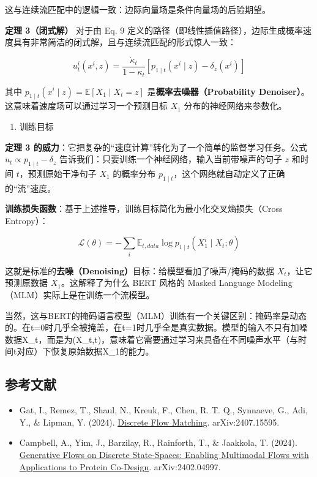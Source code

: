这与连续流匹配中的逻辑一致：边际向量场是条件向量场的后验期望。

\textbf{定理 3（闭式解）} 对于由 Eq. 9 定义的路径（即线性插值路径），边际生成概率速度具有非常简洁的闭式解，且与连续流匹配的形式惊人一致：

\[
u_t^i(x^i,z)=\frac{\dot{\kappa}_t}{1-\kappa_t}[p_{1\mid t}(x^i\mid z)-\delta_z(x^i)]
\]

其中 \(p_{1\mid t}(x^i\mid z)=\mathbb{E}[X_1\mid X_t=z]\) 是\textbf{概率去噪器（Probability Denoiser）}。这意味着速度场可以通过学习一个预测目标 \(X_1\) 分布的神经网络来参数化。

\begin{enumerate}
\def\labelenumi{\arabic{enumi}.}
\setcounter{enumi}{2}
\tightlist
\item
  训练目标
\end{enumerate}

\textbf{定理 3 的威力}：它把复杂的``速度计算''转化为了一个简单的监督学习任务。公式 \(u_t\propto p_{1\mid t}-\delta_z\) 告诉我们：只要训练一个神经网络，输入当前带噪声的句子 \(z\) 和时间 \(t\)，预测原始干净句子 \(X_1\) 的概率分布 \(p_{1\mid t}\)，这个网络就自动定义了正确的``流''速度。

\textbf{训练损失函数}：基于上述推导，训练目标简化为最小化交叉熵损失（Cross Entropy）：

\[
\mathcal{L}(\theta)=-\sum_i\mathbb{E}_{t,data}\log p_{1\mid t}(X_1^i\mid X_t;\theta)
\]

这就是标准的\textbf{去噪（Denoising）}目标：给模型看加了噪声/掩码的数据 \(X_t\)，让它预测原数据 \(X_1\)。这解释了为什么 BERT 风格的 Masked Language Modeling（MLM）实际上是在训练一个流模型。

当然，这与BERT的掩码语言模型（MLM）训练有一个关键区别：掩码率是动态的。在t=0时几乎全被掩盖，在t=1时几乎全是真实数据。模型的输入不只有加噪数据X\_t，而是为(X\_t,t)，意味着它需要通过学习来具备在不同噪声水平（与时间t对应）下恢复原始数据X\_1的能力。

\hypertarget{ux53c2ux8003ux6587ux732e-136}{%
\subsection{参考文献}\label{ux53c2ux8003ux6587ux732e-136}}

\vspace{0.25em}
\begin{itemize}
\tightlist
\item
  Gat, I., Remez, T., Shaul, N., Kreuk, F., Chen, R. T. Q., Synnaeve, G., Adi, Y., \& Lipman, Y. (2024). \href{https://arxiv.org/abs/2407.15595}{Discrete Flow Matching}. arXiv:2407.15595.
\item
  Campbell, A., Yim, J., Barzilay, R., Rainforth, T., \& Jaakkola, T. (2024). \href{https://arxiv.org/abs/2402.04997}{Generative Flows on Discrete State-Spaces: Enabling Multimodal Flows with Applications to Protein Co-Design}. arXiv:2402.04997.
\end{itemize}

